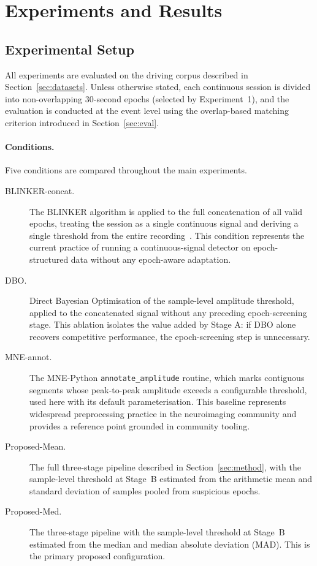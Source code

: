 
\section{Experiments and Results}
\label{sec:results}


\subsection{Experimental Setup}
\label{sec:exp_setup}

All experiments are evaluated on the driving corpus described in Section~\ref{sec:datasets}.
Unless otherwise stated, each continuous session is divided into non-overlapping
30-second epochs (selected by Experiment~1), and the evaluation is conducted at the event level using the
overlap-based matching criterion introduced in Section~\ref{sec:eval}.

\paragraph{Conditions.}
Five conditions are compared throughout the main experiments.

\begin{description}
  \item[BLINKER-concat.]
    The BLINKER algorithm is applied to the full concatenation of all valid epochs,
    treating the session as a single continuous signal and deriving a single threshold
    from the entire recording~\citep{kleifges2017blinker}.
    This condition represents the current practice of running a continuous-signal
    detector on epoch-structured data without any epoch-aware adaptation.

  \item[DBO.]
    Direct Bayesian Optimisation of the sample-level amplitude threshold,
    applied to the concatenated signal without any preceding epoch-screening stage.
    This ablation isolates the value added by Stage A: if DBO alone recovers
    competitive performance, the epoch-screening step is unnecessary.

  \item[MNE-annot.]
    The MNE-Python \texttt{annotate\_amplitude} routine, which marks contiguous
    segments whose peak-to-peak amplitude exceeds a configurable threshold,
    used here with its default parameterisation.
    This baseline represents widespread preprocessing practice in the neuroimaging
    community and provides a reference point grounded in community tooling.

  \item[Proposed-Mean.]
    The full three-stage pipeline described in Section~\ref{sec:method}, with the sample-level threshold at Stage~B estimated from the arithmetic mean and  standard deviation of samples pooled from suspicious epochs.

  \item[Proposed-Med.]
    The three-stage pipeline with the sample-level threshold at Stage~B estimated from the median and median absolute deviation (MAD). This is the primary proposed configuration.
\end{description}

